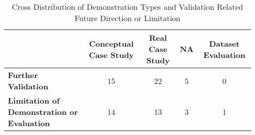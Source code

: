 \begin{table}[]
\small
\caption{Cross Distribution of Demonstration Types and Validation Related Future Direction or Limitation}
\label{tab:demo_limi}
\begin{tabularx}{\textwidth}{Xcccc}
\hline
                                          & \textbf{Conceptual Case Study} & \textbf{Real Case Study} & \textbf{NA} & \textbf{Dataset Evaluation} \\ \hline
\textbf{Further Validation}                        & 15                    & 22              & 5  & 0                  \\
\textbf{Limitation of Demonstration or Evaluation} & 14                    & 13              & 3  & 1                  \\ \hline
\end{tabularx}%
\end{table}